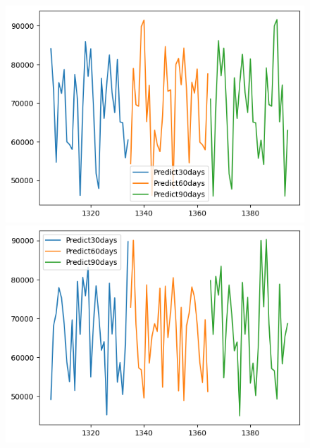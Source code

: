 \begin{figure}[H]
\begin{minipage}{0.15\textwidth}
    \includegraphics[width=1\textwidth]{resources/chapter-5/newdata1/predicted/VCB_ML_8_2_30days.png}
    \end{minipage}
    \hfill
        \begin{minipage}{0.15\textwidth}
    \centering
    \includegraphics[width=1\textwidth]{resources/chapter-5/newdata1/predicted/VCB_ML_9_1_30days.png}
    \end{minipage}
    \hfill
    \begin{minipage}{0.15\textwidth}
    \centering

\end{minipage}
\end{figure}
